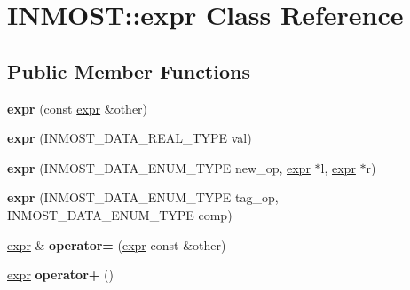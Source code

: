 \hypertarget{classINMOST_1_1expr}{\section{I\-N\-M\-O\-S\-T\-:\-:expr Class Reference}
\label{classINMOST_1_1expr}
}
\subsection*{Public Member Functions}
\begin{DoxyCompactItemize}
\item 
\hypertarget{classINMOST_1_1expr_a74a3aa228671a0b271e8377995212871}{{\bfseries expr} (const \hyperlink{classINMOST_1_1expr}{expr} \&other)}\label{classINMOST_1_1expr_a74a3aa228671a0b271e8377995212871}

\item 
\hypertarget{classINMOST_1_1expr_a67e073aad7f610fb4a101e4cfd9f463a}{{\bfseries expr} (I\-N\-M\-O\-S\-T\-\_\-\-D\-A\-T\-A\-\_\-\-R\-E\-A\-L\-\_\-\-T\-Y\-P\-E val)}\label{classINMOST_1_1expr_a67e073aad7f610fb4a101e4cfd9f463a}

\item 
\hypertarget{classINMOST_1_1expr_ad84f45b3eb283e1602fa055c059c762d}{{\bfseries expr} (I\-N\-M\-O\-S\-T\-\_\-\-D\-A\-T\-A\-\_\-\-E\-N\-U\-M\-\_\-\-T\-Y\-P\-E new\-\_\-op, \hyperlink{classINMOST_1_1expr}{expr} $\ast$l, \hyperlink{classINMOST_1_1expr}{expr} $\ast$r)}\label{classINMOST_1_1expr_ad84f45b3eb283e1602fa055c059c762d}

\item 
\hypertarget{classINMOST_1_1expr_a3f5d47c0f220674d689615bbe4f3fd33}{{\bfseries expr} (I\-N\-M\-O\-S\-T\-\_\-\-D\-A\-T\-A\-\_\-\-E\-N\-U\-M\-\_\-\-T\-Y\-P\-E tag\-\_\-op, I\-N\-M\-O\-S\-T\-\_\-\-D\-A\-T\-A\-\_\-\-E\-N\-U\-M\-\_\-\-T\-Y\-P\-E comp)}\label{classINMOST_1_1expr_a3f5d47c0f220674d689615bbe4f3fd33}

\item 
\hypertarget{classINMOST_1_1expr_a0d5ca60f969708f0076d96e5d0de9289}{\hyperlink{classINMOST_1_1expr}{expr} \& {\bfseries operator=} (\hyperlink{classINMOST_1_1expr}{expr} const \&other)}\label{classINMOST_1_1expr_a0d5ca60f969708f0076d96e5d0de9289}

\item 
\hypertarget{classINMOST_1_1expr_aa715007c278b396f273aa41c1e8570cc}{\hyperlink{classINMOST_1_1expr}{expr} {\bfseries operator+} ()}\label{classINMOST_1_1expr_aa715007c278b396f273aa41c1e8570cc}


\end{DoxyCompactItemize}
